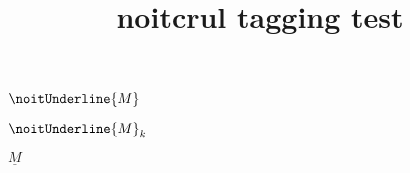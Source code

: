 \documentclass{article}
\title{noitcrul tagging test}
\begin{document}
$\noitUnderline{M}$

$\noitUnderline{M}_k$

$\underline{M}$
\end{document}
